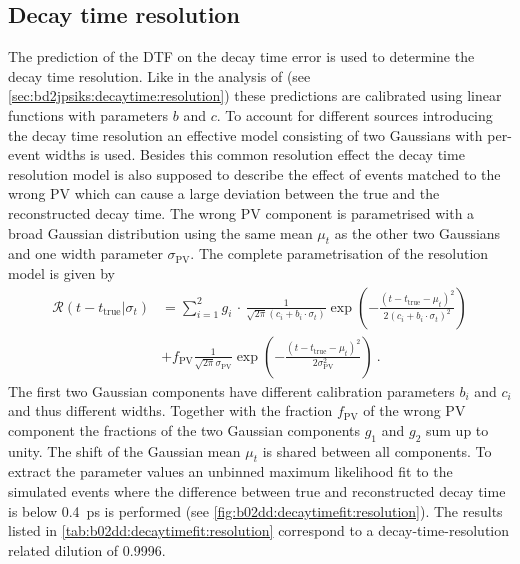 \subsection{Decay time resolution}
\label{sec:b02dd:decaytimefit:resolution}

The prediction of the DTF on the decay time error is used to determine the
decay time resolution. Like in the analysis of \BdToJPsiKS (see
\cref{sec:bd2jpsiks:decaytime:resolution}) these predictions are calibrated
using linear functions with parameters $b$ and $c$. To account for different sources
introducing the decay time resolution an effective model consisting of two
Gaussians with per-event widths is used. Besides this common resolution effect
the decay time resolution model is also supposed to describe the effect of
events matched to the wrong PV which can cause a large deviation between the
true and the reconstructed decay time. The wrong PV component is
parametrised with a broad Gaussian distribution using the same mean $\mu_t$ as
the other two Gaussians and one width parameter $\sigma_{\text{PV}}$. The
complete parametrisation of the resolution model is given by
%
\begin{equation}
\begin{split}
  {\mathcal{R}}(t-t_\text{true}|\sigma_t) &= \sum_{i=1}^{2}{g_i\,\cdot\,\frac{1}{\sqrt{2\pi}(c_i + b_i \cdot \sigma_t)}\exp\left(-\frac{(t - t_\text{true} - \mu_t)^2}{2(c_i + b_i \cdot \sigma_t)^2}\right)}\\
  &+ f_{\text{PV}} \frac{1}{\sqrt{2\pi} \sigma_{\text{PV}}} \exp\left(-\frac{(t - t_\text{true} - \mu_t)^2}{2 \sigma_{\text{PV}}^2}\right) \ .
\label{eq:b02dd:decaytimefit:resolution}
\end{split}
\end{equation}
%
The first two Gaussian components have different calibration parameters $b_i$
and $c_i$ and thus different widths. Together with the fraction $f_\text{PV}$
of the wrong PV component the fractions of the two Gaussian components $g_1$
and $g_2$ sum up to unity. The shift of the Gaussian mean $\mu_t$ is shared
between all components. To extract the parameter values an unbinned maximum
likelihood fit to the simulated events where the difference between true and
reconstructed decay time is below \SI{0.4}{\ps} is performed (see
\cref{fig:b02dd:decaytimefit:resolution}). The results listed in
\cref{tab:b02dd:decaytimefit:resolution} correspond to a decay-time-resolution
related dilution of \num{0.9996}.
%

